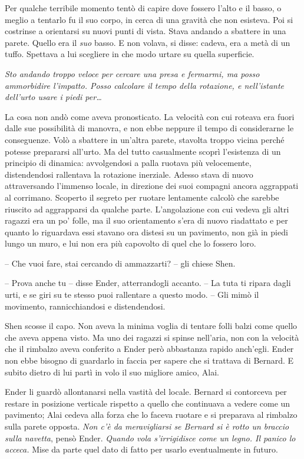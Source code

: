 {Per qualche terribile momento tentò di capire dove fossero l'alto e il
	basso, o meglio a tentarlo fu il suo corpo, in cerca di una gravità che
	non esisteva. Poi si costrinse a orientarsi su nuovi punti di vista.
	Stava andando a sbattere in una parete. Quello era il \emph{suo} basso.
	E non volava, si disse: cadeva, era a metà di un tuffo. Spettava a lui
	scegliere in che modo urtare su quella superficie.}

\emph{{Sto andando troppo veloce per cercare una presa e fermarmi, ma
		posso ammorbidire l'impatto. Posso calcolare il tempo della rotazione, e
		nell'istante dell'urto usare i piedi per\ldots{}}}

{La cosa non andò come aveva pronosticato. La velocità con cui roteava
	era fuori dalle sue possibilità di manovra, e non ebbe neppure il tempo
	di considerarne le conseguenze. Volò a sbattere in un'altra parete,
	stavolta troppo vicina perché potesse prepararsi all'urto. Ma del tutto
	casualmente scoprì l'esistenza di un principio di dinamica: avvolgendosi
	a palla ruotava più velocemente, distendendosi rallentava la rotazione
	inerziale. Adesso stava di nuovo attraversando l'immenso locale, in
	direzione dei suoi compagni ancora aggrappati al corrimano. Scoperto il
	segreto per ruotare lentamente calcolò che sarebbe riuscito ad
	aggrapparsi da qualche parte. L'angolazione con cui vedeva gli altri
	ragazzi era un po' folle, ma il suo orientamento s'era di nuovo
	riadattato e per quanto lo riguardava essi stavano ora distesi su un
	pavimento, non già in piedi lungo un muro, e lui non era più capovolto
	di quel che lo fossero loro.}

{-- Che vuoi fare, stai cercando di ammazzarti? -- gli chiese Shen.}

{-- Prova anche tu -- disse Ender, atterrandogli accanto. -- La tuta ti
	ripara dagli urti, e se giri su te stesso puoi rallentare a questo modo.
	-- Gli mimò il movimento, rannicchiandosi e distendendosi.}

{Shen scosse il capo. Non aveva la minima voglia di tentare folli balzi
	come quello che aveva appena visto. Ma uno dei ragazzi si spinse
	nell'aria, non con la velocità che il rimbalzo aveva conferito a Ender
	però abbastanza rapido anch'egli. Ender non ebbe bisogno di guardarlo in
	faccia per sapere che si trattava di Bernard. E subito dietro di lui
	partì in volo il suo migliore amico, Alai.}

{Ender li guardò allontanarsi nella vastità del locale. Bernard si
	contorceva per restare in posizione verticale rispetto a quello che
	continuava a vedere come un pavimento; Alai cedeva alla forza che lo
	faceva ruotare e si preparava al rimbalzo sulla parete opposta.
	\emph{Non c'è da meravigliarsi se Bernard si è rotto un braccio sulla
		navetta}, \emph{} pensò Ender. \emph{Quando vola s'irrigidisce come un
		legno. Il panico lo acceca.} Mise da parte quel dato di fatto per usarlo
	eventualmente in futuro.}

